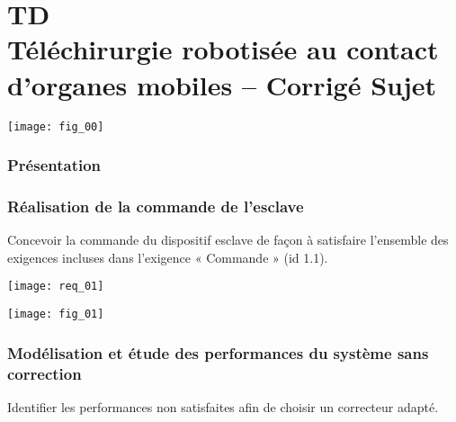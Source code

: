 \chapter*{TD  \\ 
Téléchirurgie robotisée au contact d’organes mobiles -- 
\ifprof Corrigé \else Sujet \fi}

\iflivret {} \else
\ifprof  {} \else \fi
\fi

\setcounter{question}{0}

\begin{marginfigure} [4cm]
\centering
\texttt{[image: fig\_00]}
\end{marginfigure}



\subsection*{Présentation}


\subsection*{Réalisation de la commande de l’esclave}
\begin{obj}
Concevoir la commande du dispositif esclave de façon à satisfaire l’ensemble des
exigences incluses dans l’exigence « Commande » (id 1.1).
\end{obj}

\begin{center}
\texttt{[image: req\_01]}
\end{center}

\begin{center}
\texttt{[image: fig\_01]}
\end{center}


\subsection*{Modélisation et étude des performances du système sans correction}
\begin{obj}
Identifier les performances non satisfaites afin de choisir un correcteur adapté.
\end{obj}

